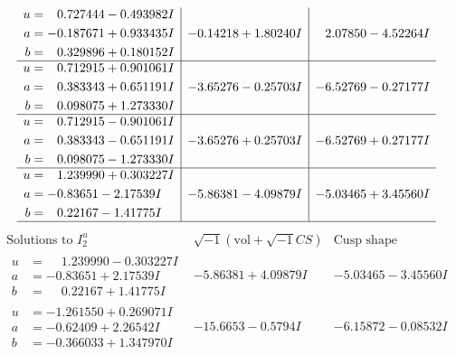 \documentclass[1p]{elsarticle_modified}
\theoremstyle{definition}
\newcommand{\I}{\sqrt{-1}}
\begin{document}
$$\begin{array}{c|c|c}
\begin{aligned}
u &= \phantom{-}0.727444 - 0.493982 I \\
a &= -0.187671 + 0.933435 I \\
b &= \phantom{-}0.329896 + 0.180152 I\end{aligned}
 & -0.14218 + 1.80240 I & \phantom{-}2.07850 - 4.52264 I \\ \hline\begin{aligned}
u &= \phantom{-}0.712915 + 0.901061 I \\
a &= \phantom{-}0.383343 + 0.651191 I \\
b &= \phantom{-}0.098075 + 1.273330 I\end{aligned}
 & -3.65276 - 0.25703 I & -6.52769 - 0.27177 I \\ \hline\begin{aligned}
u &= \phantom{-}0.712915 - 0.901061 I \\
a &= \phantom{-}0.383343 - 0.651191 I \\
b &= \phantom{-}0.098075 - 1.273330 I\end{aligned}
 & -3.65276 + 0.25703 I & -6.52769 + 0.27177 I \\ \hline\begin{aligned}
u &= \phantom{-}1.239990 + 0.303227 I \\
a &= -0.83651 - 2.17539 I \\
b &= \phantom{-}0.22167 - 1.41775 I\end{aligned}
 & -5.86381 - 4.09879 I & -5.03465 + 3.45560 I\\
 \hline 
 \end{array}$$\newpage$$\begin{array}{c|c|c}  
\text{Solutions to }I^u_{2}& \I (\text{vol} + \sqrt{-1}CS) & \text{Cusp shape}\\
 \hline 
\begin{aligned}
u &= \phantom{-}1.239990 - 0.303227 I \\
a &= -0.83651 + 2.17539 I \\
b &= \phantom{-}0.22167 + 1.41775 I\end{aligned}
 & -5.86381 + 4.09879 I & -5.03465 - 3.45560 I \\ \hline\begin{aligned}
u &= -1.261550 + 0.269071 I \\
a &= -0.62409 + 2.26542 I \\
b &= -0.366033 + 1.347970 I\end{aligned}
 & -15.6653 - 0.5794 I & -6.15872 - 0.08532 I \\ \hline\begin{aligned}

\end{aligned}
\end{array}$$
\end{document}
